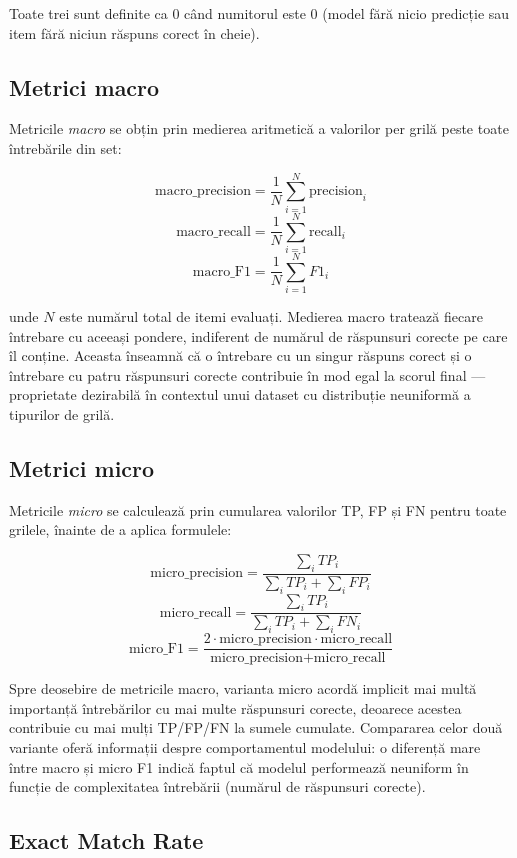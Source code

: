 \documentclass[12pt, a4paper, oneside, romanian]{teza-upb}
\begin{document}
Toate trei sunt definite ca $0$ când numitorul este $0$ (model fără nicio predicție sau item fără niciun răspuns corect în cheie).

\subsection{Metrici macro}

Metricile \textit{macro} se obțin prin medierea aritmetică a valorilor per grilă peste toate întrebările din set:

\[ \text{macro\_precision} = \frac{1}{N} \sum_{i=1}^{N} \text{precision}_i \]
\[ \text{macro\_recall} = \frac{1}{N} \sum_{i=1}^{N} \text{recall}_i \]
\[ \text{macro\_F1} = \frac{1}{N} \sum_{i=1}^{N} F1_i \]

unde $N$ este numărul total de itemi evaluați. Medierea macro tratează fiecare întrebare cu aceeași pondere, indiferent de numărul de răspunsuri corecte pe care îl conține. Aceasta înseamnă că o întrebare cu un singur răspuns corect și o întrebare cu patru răspunsuri corecte contribuie în mod egal la scorul final --- proprietate dezirabilă în contextul unui dataset cu distribuție neuniformă a tipurilor de grilă.

\subsection{Metrici micro}

Metricile \textit{micro} se calculează prin cumularea valorilor TP, FP și FN pentru toate grilele, înainte de a aplica formulele:

\[ \text{micro\_precision} = \frac{\sum_{i} TP_i}{\sum_{i} TP_i + \sum_{i} FP_i} \]
\[ \text{micro\_recall} = \frac{\sum_{i} TP_i}{\sum_{i} TP_i + \sum_{i} FN_i} \]
\[ \text{micro\_F1} = \frac{2 \cdot \text{micro\_precision} \cdot \text{micro\_recall}}{\text{micro\_precision} + \text{micro\_recall}} \]

Spre deosebire de metricile macro, varianta micro acordă implicit mai multă importanță întrebărilor cu mai multe răspunsuri corecte, deoarece acestea contribuie cu mai mulți TP/FP/FN la sumele cumulate. Compararea celor două variante oferă informații despre comportamentul modelului: o diferență mare între macro și micro F1 indică faptul că modelul performează neuniform în funcție de complexitatea întrebării (numărul de răspunsuri corecte).

\subsection{Exact Match Rate}
\end{document}
